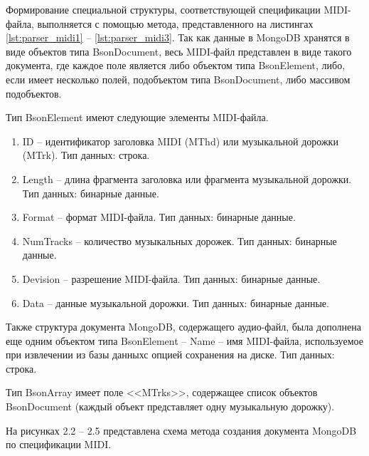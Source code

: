Формирование специальной структуры, соответствующей спецификации MIDI-файла, выполняется с помощью метода, представленного на листингах \ref{lst:parser_midi1} -- \ref{lst:parser_midi3}. Так как данные в MongoDB хранятся в виде объектов типа BsonDocument, весь MIDI-файл представлен в виде такого документа, где каждое поле является либо объектом типа BsonElement, либо, если имеет несколько полей, подобъектом типа BsonDocument, либо массивом подобъектов.

Тип BsonElement имеют следующие элементы MIDI-файла.

\begin{enumerate}
\item ID -- идентификатор заголовка MIDI (MThd) или музыкальной дорожки (MTrk). Тип данных: строка.
\item Length -- длина фрагмента заголовка или фрагмента музыкальной дорожки. Тип данных: бинарные данные.
\item Format -- формат MIDI-файла. Тип данных: бинарные данные.
\item NumTracks -- количество музыкальных дорожек. Тип данных: бинарные данные.
\item Devision -- разрешение MIDI-файла. Тип данных: бинарные данные.
\item Data -- данные музыкальной дорожки. Тип данных: бинарные данные.
\end{enumerate}
 
Также структура документа MongoDB, содержащего аудио-файл, была дополнена еще одним объектом типа BsonElement -- Name -- имя MIDI-файла, используемое при извлечении из базы данныхс опцией сохранения на диске. Тип данных: строка.

Тип BsonArray имеет поле <<MTrks>>, содержащее список объектов BsonDocument (каждый объект представляет одну музыкальную дорожку).

На рисунках 2.2 -- 2.5  представлена схема метода создания документа MongoDB по спецификации MIDI.

